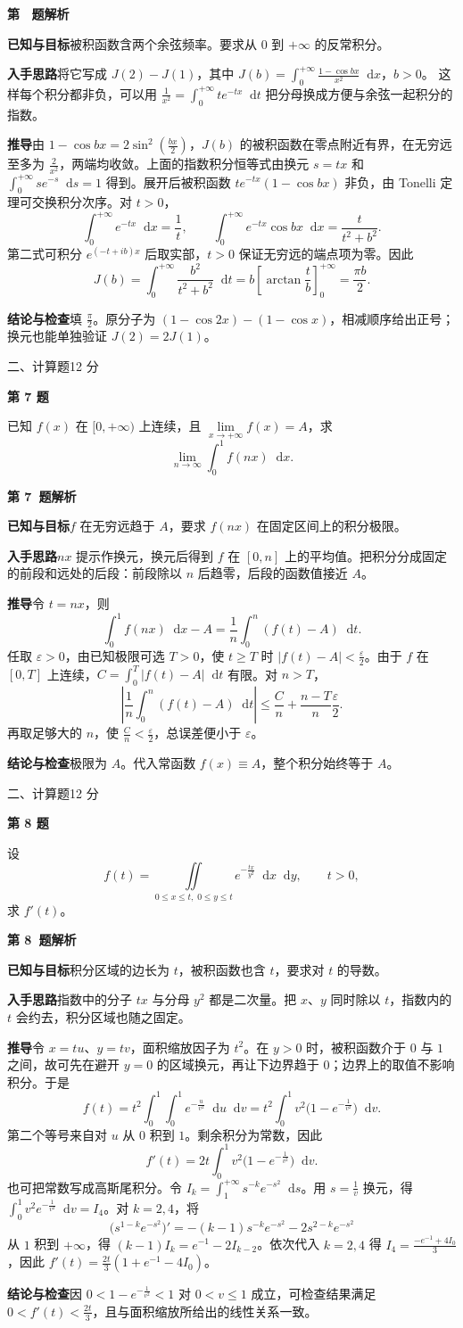 \documentclass[UTF8,zihao=-4,fontset=fandol]{ctexart}
\newcommand{\dd}{\mathop{}\!\mathrm{d}}
\newcommand{\Question}[3]{%
  \clearpage
  \def\CurrentNumber{#1}%
  \pdfbookmark[1]{第 #1 题}{q#1}%
  {\small #2\hfill #3 分}\par\medskip
  {\Large\bfseries 第 #1 题}\par\medskip
  \fontsize{14}{22}\selectfont
}
\newcommand{\Solution}{%
  \clearpage
  \fontsize{12}{18}\selectfont
  {\large\bfseries 第 \CurrentNumber\ 题解析}\par\smallskip
}
\newcommand{\Known}{\par\textbf{已知与目标}\quad}
\newcommand{\Method}{\par\textbf{入手思路}\quad}
\newcommand{\Derive}{\par\textbf{推导}\quad}
\newcommand{\Verify}{\par\textbf{结论与检查}\quad}
\begin{document}
\Solution
\Known 被积函数含两个余弦频率。要求从 $0$ 到 $+\infty$ 的反常积分。
\Method 将它写成 $J(2)-J(1)$，其中
$J(b)=\int_0^{+\infty}\frac{1-\cos bx}{x^2}\dd x$，$b>0$。
这样每个积分都非负，可以用 $\frac{1}{x^2}=\int_0^{+\infty}t e^{-tx}\dd t$ 把分母换成方便与余弦一起积分的指数。
\Derive 由 $1-\cos bx=2\sin^2(\frac{bx}{2})$，$J(b)$ 的被积函数在零点附近有界，在无穷远至多为 $\frac{2}{x^2}$，两端均收敛。上面的指数积分恒等式由换元 $s=tx$ 和 $\int_0^{+\infty}se^{-s}\dd s=1$ 得到。展开后被积函数 $t e^{-tx}(1-\cos bx)$ 非负，由 Tonelli 定理可交换积分次序。对 $t>0$，
\[
\int_0^{+\infty}e^{-tx}\dd x=\frac{1}{t},\qquad
\int_0^{+\infty}e^{-tx}\cos bx\dd x=\frac{t}{t^2+b^2}.
\]
第二式可积分 $e^{(-t+ib)x}$ 后取实部，$t>0$ 保证无穷远的端点项为零。因此
\[
J(b)=\int_0^{+\infty}\frac{b^2}{t^2+b^2}\dd t
=b\left[\arctan\frac{t}{b}\right]_{0}^{+\infty}
=\frac{\pi b}{2}.
\]
\Verify 填 $\boxed{\frac{\pi}{2}}$。原分子为 $(1-\cos 2x)-(1-\cos x)$，相减顺序给出正号；换元也能单独验证 $J(2)=2J(1)$。

\Question{7}{二、计算题}{12}
已知 $f(x)$ 在 $[0,+\infty)$ 上连续，且 $\lim\limits_{x\to+\infty}f(x)=A$，求
\[
\lim\limits_{n\to\infty}\int_0^1 f(nx)\dd x.
\]

\Solution
\Known $f$ 在无穷远趋于 $A$，要求 $f(nx)$ 在固定区间上的积分极限。
\Method $nx$ 提示作换元，换元后得到 $f$ 在 $[0,n]$ 上的平均值。把积分分成固定的前段和远处的后段：前段除以 $n$ 后趋零，后段的函数值接近 $A$。
\Derive 令 $t=nx$，则
\[
\int_0^1 f(nx)\dd x-A=\frac{1}{n}\int_0^n(f(t)-A)\dd t.
\]
任取 $\varepsilon>0$，由已知极限可选 $T>0$，使 $t\ge T$ 时 $|f(t)-A|<\frac{\varepsilon}{2}$。由于 $f$ 在 $[0,T]$ 上连续，$C=\int_0^T|f(t)-A|\dd t$ 有限。对 $n>T$，
\[
\left|\frac{1}{n}\int_0^n(f(t)-A)\dd t\right|
\le \frac{C}{n}+\frac{n-T}{n}\frac{\varepsilon}{2}.
\]
再取足够大的 $n$，使 $\frac{C}{n}<\frac{\varepsilon}{2}$，总误差便小于 $\varepsilon$。
\Verify 极限为 $\boxed{A}$。代入常函数 $f(x)\equiv A$，整个积分始终等于 $A$。

\Question{8}{二、计算题}{12}
设
\[
f(t)=\iint\limits_{0\le x\le t,\;0\le y\le t} e^{-\frac{tx}{y^2}}\dd x\dd y,
\qquad t>0,
\]
求 $f'(t)$。

\Solution
\Known 积分区域的边长为 $t$，被积函数也含 $t$，要求对 $t$ 的导数。
\Method 指数中的分子 $tx$ 与分母 $y^2$ 都是二次量。把 $x$、$y$ 同时除以 $t$，指数内的 $t$ 会约去，积分区域也随之固定。
\Derive 令 $x=tu$、$y=tv$，面积缩放因子为 $t^2$。在 $y>0$ 时，被积函数介于 $0$ 与 $1$ 之间，故可先在避开 $y=0$ 的区域换元，再让下边界趋于 $0$；边界上的取值不影响积分。于是
\[
f(t)=t^2\int_0^1\int_0^1 e^{-\frac{u}{v^2}}\dd u\dd v
=t^2\int_0^1 v^2\bigl(1-e^{-\frac{1}{v^2}}\bigr)\dd v.
\]
第二个等号来自对 $u$ 从 $0$ 积到 $1$。剩余积分为常数，因此
\[
\boxed{f'(t)=2t\int_0^1 v^2\bigl(1-e^{-\frac{1}{v^2}}\bigr)\dd v}.
\]
也可把常数写成高斯尾积分。令 $I_k=\int_1^{+\infty}s^{-k}e^{-s^2}\dd s$。用 $s=\frac{1}{v}$ 换元，得 $\int_0^1 v^2 e^{-\frac{1}{v^2}}\dd v=I_4$。对 $k=2,4$，将
\[
\bigl(s^{1-k}e^{-s^2}\bigr)'=-(k-1)s^{-k}e^{-s^2}-2s^{2-k}e^{-s^2}
\]
从 $1$ 积到 $+\infty$，得 $(k-1)I_k=e^{-1}-2I_{k-2}$。依次代入 $k=2,4$ 得 $I_4=\frac{-e^{-1}+4I_0}{3}$，因此 $f'(t)=\frac{2t}{3}(1+e^{-1}-4I_0)$。
\Verify 因 $0<1-e^{-\frac{1}{v^2}}<1$ 对 $0<v\le 1$ 成立，可检查结果满足 $0<f'(t)<\frac{2t}{3}$，且与面积缩放所给出的线性关系一致。
\end{document}
